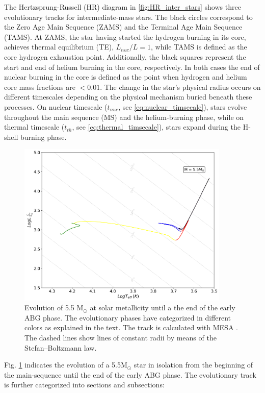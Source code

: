 The Hertzsprung-Russell (HR) diagram in \cref{fig:HR_inter_stars} shows three evolutionary tracks for intermediate-mass stars. The black circles correspond to the Zero Age Main Sequence (ZAMS) and the Terminal Age Main Sequence (TAMS). At ZAMS, the star having started the hydrogen burning in its core, achieves thermal equilibrium (TE), $L_{nuc}/L =1$, while TAMS is defined as the core hydrogen exhaustion point. Additionally, the black squares represent the start and end of helium burning in the core, respectively. In both cases the end of nuclear burning in the core is defined as the point when hydrogen and helium core mass fractions are $< 0.01$. The change in the star's physical radius occurs on different timescales depending on the physical mechanism buried beneath these processes. On nuclear timescale ($t_{nuc}$, see \ref{eq:nuclear_timsecale}), stars evolve throughout the main sequence (MS) and the helium-burning phase, while on thermal timescale ($t_{th}$, see \ref{eq:thermal_timsecale}), stars expand during the H-shell burning phase.
\begin{figure}[H]
    \centering
    \includegraphics[width=0.9\textwidth]{Thesis/graphs/HR_evolution.pdf}
    \caption{Evolution of 5.5 M$_{\odot}$ at solar metallicity until a the end of the early ABG phase. The evolutionary phases have categorized in different colors as explained in the text. The track is calculated with MESA \citep{paxton2010modules,paxton2013modules,paxton2015modules,paxton2019modules}. The dashed lines show lines of constant radii by means of the Stefan–Boltzmann law.}
    \label{fig:HR_evolution}
\end{figure}
Fig. \ref{fig:HR_evolution} indicates the evolution of a 5.5M$_{\odot}$ star in isolation from the beginning of the main-sequence until the end of the early ABG phase. The evolutionary track is further categorized into sections and subsections: 
